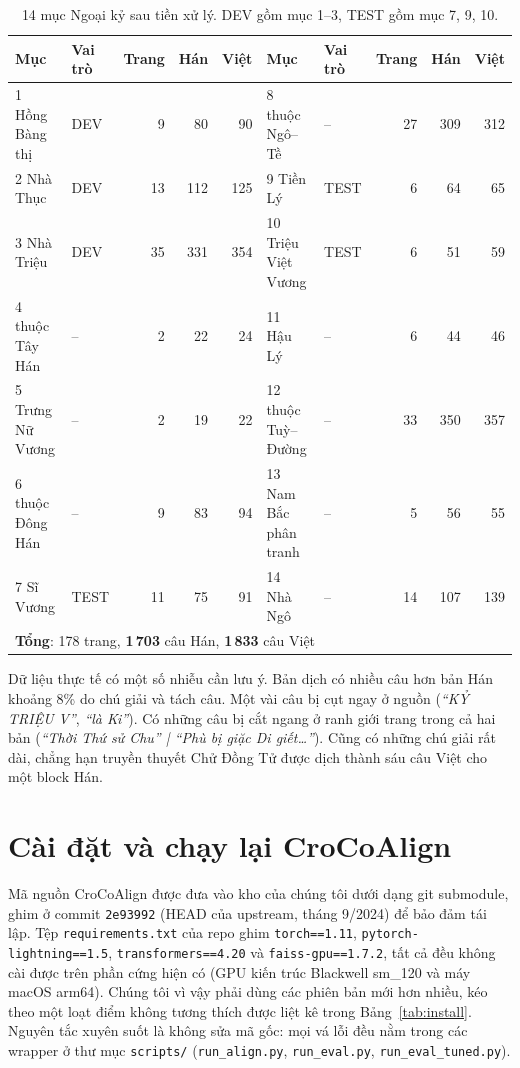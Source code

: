 \documentclass[11pt,a4paper]{article}
\newcommand{\code}[1]{\texttt{#1}}
\newcommand{\B}[1]{\textbf{#1}}
\newcommand{\croco}{CroCoAlign}
\begin{document}
\begin{table}[h]\centering\footnotesize
\caption{14 mục Ngoại kỷ sau tiền xử lý. DEV gồm mục 1--3, TEST gồm mục 7, 9, 10.}\label{tab:data}
\begin{tabular}{llrrr@{\hspace{1.2em}}llrrr}
\toprule
\B{Mục} & \B{Vai trò} & \B{Trang} & \B{Hán} & \B{Việt} & \B{Mục} & \B{Vai trò} & \B{Trang} & \B{Hán} & \B{Việt}\\
\midrule
1 Hồng Bàng thị & DEV & 9 & 80 & 90     & 8 thuộc Ngô--Tề & -- & 27 & 309 & 312\\
2 Nhà Thục & DEV & 13 & 112 & 125       & 9 Tiền Lý & TEST & 6 & 64 & 65\\
3 Nhà Triệu & DEV & 35 & 331 & 354      & 10 Triệu Việt Vương & TEST & 6 & 51 & 59\\
4 thuộc Tây Hán & -- & 2 & 22 & 24      & 11 Hậu Lý & -- & 6 & 44 & 46\\
5 Trưng Nữ Vương & -- & 2 & 19 & 22     & 12 thuộc Tuỳ--Đường & -- & 33 & 350 & 357\\
6 thuộc Đông Hán & -- & 9 & 83 & 94     & 13 Nam Bắc phân tranh & -- & 5 & 56 & 55\\
7 Sĩ Vương & TEST & 11 & 75 & 91        & 14 Nhà Ngô & -- & 14 & 107 & 139\\
\midrule
\multicolumn{10}{l}{\B{Tổng}: 178 trang, \B{1\,703} câu Hán, \B{1\,833} câu Việt}\\
\bottomrule
\end{tabular}
\end{table}

Dữ liệu thực tế có một số nhiễu cần lưu ý. Bản dịch có nhiều câu hơn bản Hán khoảng 8\% do chú giải và tách câu. Một
vài câu bị cụt ngay ở nguồn (\emph{``KỶ TRIỆU V''}, \emph{``là Ki''}). Có những câu bị cắt ngang ở ranh giới trang trong
cả hai bản (\emph{``Thời Thứ sử Chu'' | ``Phù bị giặc Di giết\ldots''}). Cũng có những chú giải rất dài, chẳng hạn truyền
thuyết Chử Đồng Tử được dịch thành sáu câu Việt cho một block Hán.

\section{Cài đặt và chạy lại \croco{}}\label{sec:setup}

Mã nguồn \croco{} được đưa vào kho của chúng tôi dưới dạng git submodule, ghim ở commit \code{2e93992} (HEAD của
upstream, tháng 9/2024) để bảo đảm tái lập. Tệp \code{requirements.txt} của repo ghim \code{torch==1.11},
\code{pytorch-lightning==1.5}, \code{transformers==4.20} và \code{faiss-gpu==1.7.2}, tất cả đều không cài được trên
phần cứng hiện có (GPU kiến trúc Blackwell sm\_120 và máy macOS arm64). Chúng tôi vì vậy phải dùng các phiên bản mới
hơn nhiều, kéo theo một loạt điểm không tương thích được liệt kê trong Bảng~\ref{tab:install}. Nguyên tắc xuyên suốt
là không sửa mã gốc: mọi vá lỗi đều nằm trong các wrapper ở thư mục \code{scripts/} (\code{run\_align.py},
\code{run\_eval.py}, \code{run\_eval\_tuned.py}).
\end{document}
